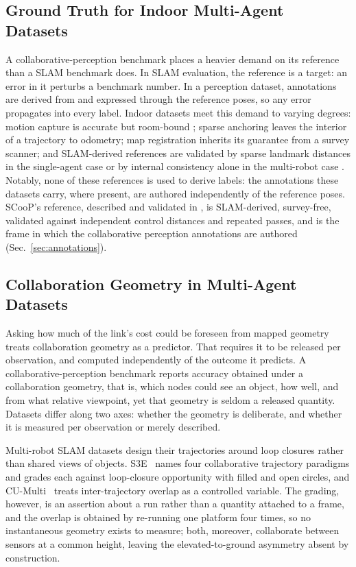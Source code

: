 \documentclass[journal]{IEEEtran}
\begin{document}
\subsection{Ground Truth for Indoor Multi-Agent Datasets}
A collaborative-perception benchmark places a heavier demand on its
reference than a SLAM benchmark does. In SLAM evaluation, the
reference is a target: an error in it perturbs a benchmark number. In
a perception dataset, annotations are derived from and expressed
through the reference poses, so any error propagates into every
label. Indoor datasets meet this demand to varying degrees: motion
capture is accurate but room-bound \cite{utias,m2dgr}; sparse
anchoring \cite{hilti2022,airmuseum,s3e} leaves the interior of a
trajectory to odometry; map registration \cite{subtmrs,lamar}
inherits its guarantee from a survey scanner; and SLAM-derived
references are validated by sparse landmark distances in the
single-agent case \cite{incrowdvi} or by internal consistency alone in
the multi-robot case \cite{envodat}. Notably, none of these references
is used to derive labels: the annotations these datasets carry, where
present, are authored independently of the reference poses. SCooP's
reference, described and validated in \cite{scoop_testbed}, is
SLAM-derived, survey-free, validated against independent control
distances and repeated passes, and is the frame in which the
collaborative perception annotations are authored
(Sec.~\ref{sec:annotations}).

\subsection{Collaboration Geometry in Multi-Agent Datasets}
\label{sec:geometry_related}

Asking how much of the link's cost could be foreseen from mapped
geometry treats collaboration geometry as a predictor. That requires
it to be released per observation, and computed independently of the
outcome it predicts. A collaborative-perception benchmark reports
accuracy obtained under a collaboration geometry, that is, which nodes
could see an object, how well, and from what relative viewpoint, yet
that geometry is seldom a released quantity. Datasets differ along two
axes: whether the geometry is deliberate, and whether it is measured
per observation or merely described.

Multi-robot SLAM datasets design their trajectories around loop
closures rather than shared views of objects. S3E~\cite{s3e} names
four collaborative trajectory paradigms and grades each against
loop-closure opportunity with filled and open circles, and
CU-Multi~\cite{cumulti} treats inter-trajectory overlap as a
controlled variable. The grading, however, is an assertion about a run
rather than a quantity attached to a frame, and the overlap is
obtained by re-running one platform four times, so no instantaneous
geometry exists to measure; both, moreover, collaborate between
sensors at a common height, leaving the elevated-to-ground asymmetry
absent by construction.
\end{document}
